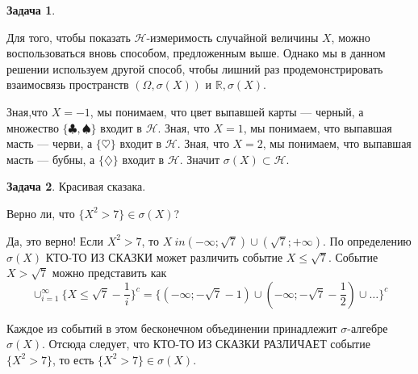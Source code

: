 \documentclass[pdftex, 12pt, a4paper]{article}
\def\R{\ensuremath{\mathbb{R}}} %
\def\s{\ensuremath{\sigma}}
\def \Om{\Omega}
\renewcommand{\le}{\leqslant}
\theoremstyle{definition} %
\newtheorem{problem}{Задача}
\numberwithin{problem}{section}
\numberwithin{blits}{section}
\begin{document}
\begin{problem}
\begin{sol}
Для того, чтобы показать $\mathcal{H}$-измеримость случайной величины $X$, можно воспользоваться вновь способом, предложенным выше. Однако мы в данном решении используем другой способ, чтобы лишний раз продемонстрировать взаимосвязь пространств $(\Om,\s(X))$ и $\R,\s(X)$. 

Зная,что $X= -1$, мы понимаем, что цвет выпавшей карты --- черный, а множество $\{\clubsuit,\spadesuit\}$ входит в $\mathcal{H}$. Зная, что $X=1$, мы понимаем, что выпавшая масть --- черви, а $\{\heartsuit\}$ входит в $\mathcal{H}$. Зная, что $X=2$, мы понимаем, что выпавшая масть --- бубны, а $\{\diamondsuit\}$ входит в $\mathcal{H}$. Значит $\s(X) \subset \mathcal{H}$.
\end{sol}
\end{problem}




\begin{problem}
Красивая сказака.

Верно ли, что $\{X^2 >7 \} \in \s(X)$?
\begin{sol}
Да, это верно! Если $X^2 > 7$, то $X \ in (-\infty;\sqrt{7}) \cup (\sqrt{7}; +\infty)$. По определению $\s(X)$ КТО-ТО ИЗ СКАЗКИ может различить событие $X \le \sqrt{7}$. Событие $X > \sqrt{7}$ можно представить как \[\cup_{i=1}^{\infty}\{X \le \sqrt{7} - \frac{1}{i}\}^c = \{(-\infty;-\sqrt{7}-1) \cup (-\infty;-\sqrt{7}-\frac{1}{2}) \cup \ldots \}^c\]

Каждое из событий в этом бесконечном объединении принадлежит \s-алгебре $\s(X)$. Отсюда следует, что КТО-ТО ИЗ СКАЗКИ РАЗЛИЧАЕТ событие $\{X^2 >7 \}$, то есть $\{X^2 >7 \} \in \s(X)$.
\end{sol}
\end{problem}
\end{document}
